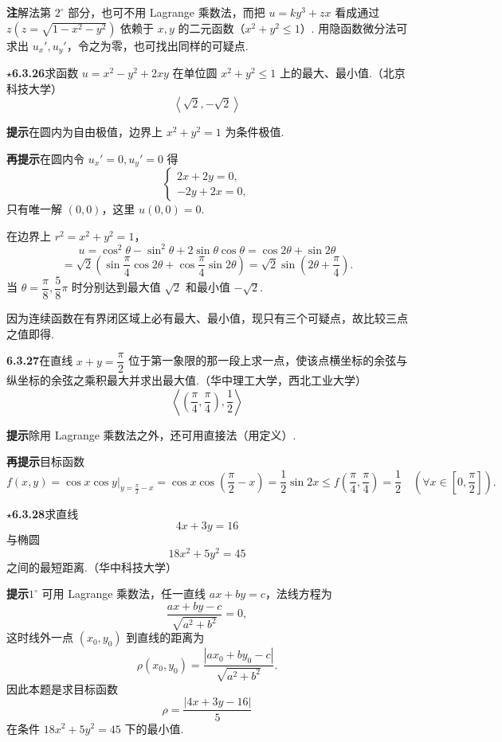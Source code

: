 \documentclass[UTF8, 12pt, fontset=fandol, oneside]{ctexart}
\begin{document}
\noindent\textbf{注}\quad 解法第 $2^\circ$ 部分，也可不用 Lagrange 乘数法，而把 $u=ky^3+zx$ 看成通过 $z(z=\sqrt{1-x^2-y^2})$ 依赖于 $x,y$ 的二元函数（$x^2+y^2\le1$）. 用隐函数微分法可求出 $u_x',u_y'$，令之为零，也可找出同样的可疑点.

\noindent\textbf{\ensuremath{\star}6.3.26}\quad 求函数 $u=x^2-y^2+2xy$ 在单位圆 $x^2+y^2\le1$ 上的最大、最小值.（北京科技大学）
\[
  \left\langle\sqrt2,-\sqrt2\right\rangle
\]

\noindent\textbf{提示}\quad 在圆内为自由极值，边界上 $x^2+y^2=1$ 为条件极值.

\noindent\textbf{再提示}\quad 在圆内令 $u_x'=0,u_y'=0$ 得
\[
  \begin{cases}
    2x+2y=0,\\
    -2y+2x=0,
  \end{cases}
\]
只有唯一解 $(0,0)$，这里 $u(0,0)=0$.

在边界上 $r^2=x^2+y^2=1$，
\[
  u=\cos^2\theta-\sin^2\theta+2\sin\theta\cos\theta
  =\cos2\theta+\sin2\theta
\]
\[
  =\sqrt2\left(\sin\frac\pi4\cos2\theta+\cos\frac\pi4\sin2\theta\right)
  =\sqrt2\sin\left(2\theta+\frac\pi4\right).
\]
当 $\theta=\dfrac\pi8,\dfrac58\pi$ 时分别达到最大值 $\sqrt2$ 和最小值 $-\sqrt2$.

因为连续函数在有界闭区域上必有最大、最小值，现只有三个可疑点，故比较三点之值即得.

\noindent\textbf{6.3.27}\quad 在直线 $x+y=\dfrac\pi2$ 位于第一象限的那一段上求一点，使该点横坐标的余弦与纵坐标的余弦之乘积最大并求出最大值.（华中理工大学，西北工业大学）
\[
  \left\langle\left(\frac\pi4,\frac\pi4\right),\frac12\right\rangle
\]

\noindent\textbf{提示}\quad 除用 Lagrange 乘数法之外，还可用直接法（用定义）.

\noindent\textbf{再提示}\quad 目标函数
\[
  f(x,y)=\cos x\cos y\big|_{y=\frac\pi2-x}
  =\cos x\cos\left(\frac\pi2-x\right)
  =\frac12\sin2x
  \le f\left(\frac\pi4,\frac\pi4\right)=\frac12
  \quad\left(\forall x\in\left[0,\frac\pi2\right]\right).
\]

\noindent\textbf{\ensuremath{\star}6.3.28}\quad 求直线
\[
  4x+3y=16 \tag{1}
\]
与椭圆
\[
  18x^2+5y^2=45 \tag{2}
\]
之间的最短距离.（华中科技大学）

\noindent\textbf{提示}\quad $1^\circ$ 可用 Lagrange 乘数法，任一直线 $ax+by=c$，法线方程为
\[
  \frac{ax+by-c}{\sqrt{a^2+b^2}}=0,
\]
这时线外一点 $(x_0,y_0)$ 到直线的距离为
\[
  \rho(x_0,y_0)=\frac{|ax_0+by_0-c|}{\sqrt{a^2+b^2}}.
\]
因此本题是求目标函数
\[
  \rho=\frac{|4x+3y-16|}{5}
\]
在条件 $18x^2+5y^2=45$ 下的最小值.
\end{document}
